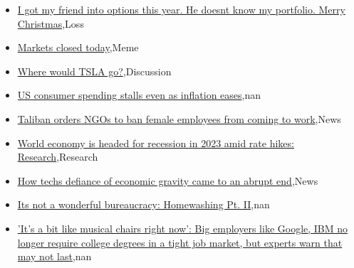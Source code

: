 \documentclass{article}%
\begin{document}
%
\begin{itemize}%
\item%
\href{https://reddit.com/r/wallstreetbets/comments/zvkr51/i\_got\_my\_friend\_into\_options\_this\_year\_he\_doesnt/}{I got my friend into options this year. He doesnt know my portfolio. Merry Christmas},Loss%
\item%
\href{https://reddit.com/r/wallstreetbets/comments/zvk24f/markets\_closed\_today/}{Markets closed today},Meme%
\item%
\href{https://reddit.com/r/wallstreetbets/comments/zvj6ga/where\_would\_tsla\_go/}{Where would TSLA go?},Discussion%
\item%
\href{https://reddit.com/r/Economics/comments/zvg557/us\_consumer\_spending\_stalls\_even\_as\_inflation/}{US consumer spending stalls even as inflation eases},nan%
\item%
\href{https://reddit.com/r/Economics/comments/zvfrw8/taliban\_orders\_ngos\_to\_ban\_female\_employees\_from/}{Taliban orders NGOs to ban female employees from coming to work},News%
\item%
\href{https://reddit.com/r/Economics/comments/zvcx6k/world\_economy\_is\_headed\_for\_recession\_in\_2023/}{World economy is headed for recession in 2023 amid rate hikes: Research},Research%
\item%
\href{https://reddit.com/r/Economics/comments/zv65tf/how\_techs\_defiance\_of\_economic\_gravity\_came\_to\_an/}{How techs defiance of economic gravity came to an abrupt end},News%
\item%
\href{https://reddit.com/r/Economics/comments/zv5x1b/its\_not\_a\_wonderful\_bureaucracy\_homewashing\_pt\_ii/}{Its not a wonderful bureaucracy: Homewashing Pt. II},nan%
\item%
\href{https://reddit.com/r/Economics/comments/zv0374/its\_a\_bit\_like\_musical\_chairs\_right\_now\_big/}{'It's a bit like musical chairs right now': Big employers like Google, IBM no longer require college degrees in a tight job market, but experts warn that may not last},nan%
\end{itemize}%
\end{document}
